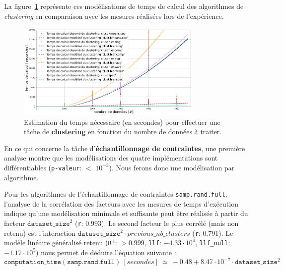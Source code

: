 			La figure~\ref{figure:4.3.2-ETUDE-COUTS-TEMPS-CALCUL-MODELISATION-CLUSTERING} représente ces modélisations de temps de calcul des algorithmes de \textit{clustering} en comparaison avec les mesures réalisées lors de l'expérience.
			\newline
			\begin{figure}[!htb]
				\centering
				\includegraphics[width=0.8\textwidth]{figures/etude-temps-calcul-modelisation-3clust}
				\caption{Estimation du temps nécessaire (en secondes) pour effectuer une tâche de \textbf{clustering} en fonction du nombre de données à traiter.}
				\label{figure:4.3.2-ETUDE-COUTS-TEMPS-CALCUL-MODELISATION-CLUSTERING}
			\end{figure}
			
			
			En ce qui concerne la tâche d'\textbf{échantillonnage de contraintes}, une première analyse montre que les modélisations des quatre implémentations sont différentiables  (\texttt{p-valeur}: $<$ \texttt{$10^{-3}$}). Nous ferons donc une modélisation par algorithme.
			
			Pour les algorithmes de l'échantillonnage de contraintes \texttt{samp.rand.full}, l'analyse de la corrélation des facteurs avec les mesures de temps d'exécution indique qu'une modélisation minimale et suffisante peut être réalisée à partir du facteur $\texttt{dataset\_size}^{2}$ (\texttt{r}: $0.993$).
			Le second facteur le plus corrélé (mais non retenu) est l'interaction $\texttt{dataset\_size}^{2} \cdot previous\_nb\_clusters$ (\texttt{r}: $0.791$).
			Le modèle linéaire généralisé retenu (\texttt{R²}: $> 0.999$, \texttt{llf}: $-4.33 \cdot 10^{4}$, \texttt{llf\_null}: $-1.17 \cdot 10^{5}$) nous permet de déduire l'équation suivante :
			\begin{equation}
				\texttt{computation\_time}(\texttt{samp.rand.full})~[secondes]~
				\simeq~-0.48 + 8.47 \cdot 10^{-7} \cdot \texttt{dataset\_size}^{2}
			\end{equation}
			
